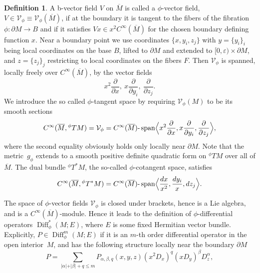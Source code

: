 \documentclass[JEP,XML,SOM,Unicode,NoFloatCountersInSection,published]{cedram}
\theoremstyle{plain}
\theoremstyle{definition}
\newtheorem{defn}[Th]{Definition}
\newcommand\calV{{\mathcal V}}
\DeclareMathOperator{\Diff}{Diff}
\DeclareMathOperator{\Span}{span}
\newcommand{\Cinf}{C^\infty}
\newcommand{\phiT}{{}^\phi T}
\newcommand{\Mbar}{{\overline{M}}}\let\M\Mbar
\begin{document}
\begin{defn}\label{Phi-vector-def}
A b-vector field $V$ on $\Mbar$ is called a $\phi$-vector field, $V\in\mathcal{V}_{\phi}\equiv \mathcal{V}_{\phi}(\M)$, if at the boundary it is tangent to the fibers of the fibration
$\phi: \partial M \to B$ and if it satisfies $Vx \in x^{2}C^{\infty}(\Mbar)$ for the chosen boundary defining function $x$. Near a boundary point we use coordinates
$\{x,y_i,z_j\}$ with $y = \{y_i\}_i$
being local coordinates on the base $B$, lifted to $\partial M$ and extended to
$[0,\varepsilon) \times \partial M$, and $z=\{z_j\}_j$ restricting to local coordinates on the fibers $F$. Then $\calV_\phi$ is spanned, locally freely over $\Cinf(\Mbar)$, by the vector fields
\[
x^{2}\frac{\partial}{\partial x},\ x\frac{\partial}{\partial y_{i}},\ \frac{\partial}{\partial z_{j}}.
\]
We introduce the so called $\phi$-tangent space by requiring $\mathcal{V}_{\phi}(M)$
to be its smooth sections
\begin{equation*}
C^\infty(\Mbar, {}^\phi TM) = \mathcal{V}_{\phi}
= C^\infty(\Mbar)\text{-}\Span\Bigl\langle x^{2}\frac{\partial}{\partial x},
x\frac{\partial}{\partial y_{i}}, \frac{\partial}{\partial z_{j}}\Bigr\rangle,
\end{equation*}
where the second equality obviously holds only locally near $\partial M$.
Note that the metric~$g_\phi$ extends to a smooth positive definite quadratic form on $\phiT M$ over all of $\Mbar$.
The dual bundle $\phiT^{*} M$, the so-called $\phi$-cotangent space, satisfies
\begin{equation*}
C^\infty(\Mbar, {}^\phi T^*M) =
C^\infty(\Mbar)\text{-}\Span\Bigl\langle \frac{dx}{x^{2}}, \frac{dy_{i}}{x},dz_{j}\Bigr\rangle.
\end{equation*}
\end{defn}
The space of $\phi$-vector fields $\mathcal{V}_{\phi}$ is closed under brackets, hence is a Lie algebra,
and is a $C^{\infty}(\Mbar)$-module. Hence it leads to the definition of
$\phi$-differential opera\-tors $\Diff_{\phi}^{*}(M; E)$, where $E$ is some fixed Hermitian vector bundle.
Explicitly, \hbox{$P \in \Diff_{\phi}^{m}(M; E)$} if it is an $m$-th order differential operator
in the open interior~$M$, and has the following structure locally near
the boundary $\partial M$
\begin{equation}\label{diff-phi}
P = \sum_{\vert \alpha \vert + \vert \beta \vert + q \leq m}
P_{\alpha,\beta,q}(x,y,z)(x^{2}D_{x})^{q}(xD_{y})^\beta D_{z}^{\alpha},
\end{equation}
\end{document}
